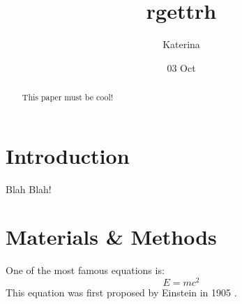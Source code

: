\documentclass[12pt]{article}
\title{rgettrh}
\author{Katerina}
\date{03 Oct}
\begin{document}
\maketitle

\begin{abstract}
This paper must be cool!
\end{abstract}

\section{Introduction}
Blah Blah!

\section{Materials \& Methods}
One of the most famous equations is:
\begin{equation}
    E = mc^2
\end{equation}
This equation was first proposed by Einstein in 1905 
\cite{einstein1905does}.



\end{document}

